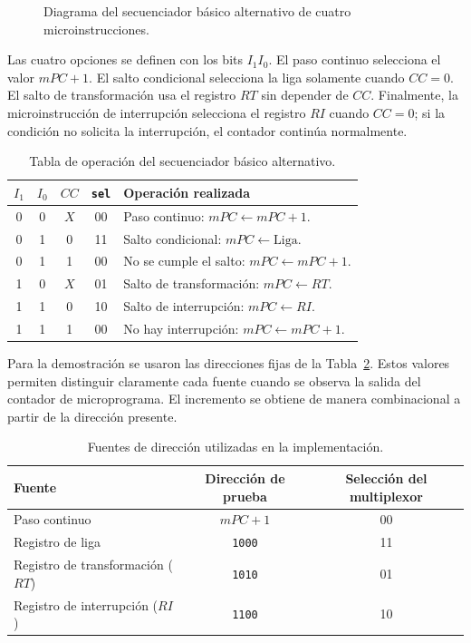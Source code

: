 \documentclass[letterpaper,12pt]{article}
\begin{document}
\begin{figure}[H]
{%
}
\fi
\caption{Diagrama del secuenciador básico alternativo de cuatro microinstrucciones.}
\label{fig:secuenciador-general}
\end{figure}


Las cuatro opciones se definen con los bits $I_1I_0$. El paso continuo selecciona el valor $mPC+1$. El salto condicional selecciona la liga solamente cuando $CC=0$. El salto de transformación usa el registro $RT$ sin depender de $CC$. Finalmente, la microinstrucción de interrupción selecciona el registro $RI$ cuando $CC=0$; si la condición no solicita la interrupción, el contador continúa normalmente.

\begin{table}[H]
\centering
\small
\caption{Tabla de operación del secuenciador básico alternativo.}
\label{tab:microinstrucciones}
\begin{tabular}{c c c c l}
\toprule
$I_1$ & $I_0$ & $CC$ & \texttt{sel} & Operación realizada \\
\midrule
0 & 0 & $X$ & 00 & Paso continuo: $mPC \leftarrow mPC+1$. \\
0 & 1 & 0 & 11 & Salto condicional: $mPC \leftarrow \text{Liga}$. \\
0 & 1 & 1 & 00 & No se cumple el salto: $mPC \leftarrow mPC+1$. \\
1 & 0 & $X$ & 01 & Salto de transformación: $mPC \leftarrow RT$. \\
1 & 1 & 0 & 10 & Salto de interrupción: $mPC \leftarrow RI$. \\
1 & 1 & 1 & 00 & No hay interrupción: $mPC \leftarrow mPC+1$. \\
\bottomrule
\end{tabular}
\end{table}

Para la demostración se usaron las direcciones fijas de la Tabla~\ref{tab:direcciones}. Estos valores permiten distinguir claramente cada fuente cuando se observa la salida del contador de microprograma. El incremento se obtiene de manera combinacional a partir de la dirección presente.

\begin{table}[H]
\centering
\caption{Fuentes de dirección utilizadas en la implementación.}
\label{tab:direcciones}
\begin{tabular}{l c c}
\toprule
Fuente & Dirección de prueba & Selección del multiplexor \\
\midrule
Paso continuo & $mPC+1$ & 00 \\
Registro de liga & \texttt{1000} & 11 \\
Registro de transformación ($RT$) & \texttt{1010} & 01 \\
Registro de interrupción ($RI$) & \texttt{1100} & 10 \\
\bottomrule
\end{tabular}
\end{table}
\end{document}
